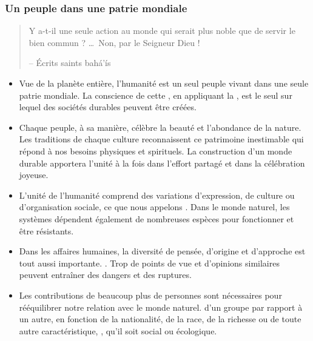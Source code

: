 \documentclass[11pt,xcolor={dvipsnames},hyperref={pdftex,pdfpagemode=UseNone,hidelinks,pdfdisplaydoctitle=true},usepdftitle=false]{beamer}
\begin{document}
\begin{frame}[allowframebreaks=0.8]
  \frametitle{Un peuple dans une patrie mondiale}
  \begin{quote}
    Y a-t-il une seule action au monde qui serait plus noble que de servir le
    bien commun ? \ldots\ Non, par le Seigneur Dieu !

    \raggedleft -- Écrits saints bahá’ís
  \end{quote}
  \begin{itemize}
    \item Vue de la planète entière, l'humanité est un seul peuple vivant dans
      une seule patrie mondiale. La conscience de cette , en appliquant la
      , est le seul  sur lequel des sociétés durables peuvent
      être créées.
    \item Chaque peuple, à sa manière, célèbre la beauté et l'abondance de la
      nature. Les traditions de chaque culture reconnaissent ce patrimoine
      inestimable qui répond à nos besoins physiques et spirituels. La
      construction d'un monde durable apportera l'unité à la fois dans l'effort
      partagé et dans la célébration joyeuse.
    \item L'unité de l'humanité comprend des variations d'expression, de culture
      ou d'organisation sociale, ce que nous appelons .
      Dans le monde naturel, les systèmes dépendent également de nombreuses
      espèces pour fonctionner et être résistants.
    \item Dans les affaires humaines, la diversité de pensée, d'origine et
      d'approche est tout aussi importante. . Trop de points de vue et
      d'opinions similaires peuvent entraîner des dangers et des ruptures.
    \item Les contributions de beaucoup plus de personnes sont nécessaires pour
      rééquilibrer notre relation avec le monde naturel.  d'un groupe par rapport à un autre, en fonction de la
      nationalité, de la race, de la richesse ou de toute autre caractéristique,
      , qu'il soit social ou écologique.
  \end{itemize}
\end{frame}
\end{document}
